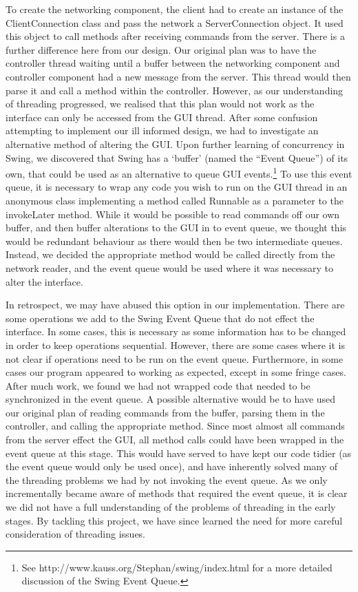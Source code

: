 To create the networking component, the client had to create an instance of the ClientConnection class and pass the network a ServerConnection object. It used this object to call methods after receiving commands from the server. There is a further difference here from our design. Our original plan was to have the controller thread waiting until a buffer between the networking component and controller component had a new message from the server. This thread would then parse it and call a method within the controller. However, as our understanding of threading progressed, we realised that this plan would not work as the interface can only be accessed from the GUI thread. After some confusion attempting to implement our ill informed design, we had to investigate an alternative method of altering the GUI. Upon further learning of concurrency in Swing, we discovered that Swing has a `buffer' (named the ``Event Queue'') of its own, that could be used as an alternative to queue GUI events.\footnote{See http://www.kauss.org/Stephan/swing/index.html for a more detailed discussion of the Swing Event Queue.} To use this event queue, it is necessary to wrap any code you wish to run on the GUI thread in an anonymous class implementing a method called Runnable as a parameter to the invokeLater method.  While it would be possible to read commands off our own buffer, and then buffer alterations to the GUI in to event queue, we thought this would be redundant behaviour as there would then be two intermediate queues. Instead, we decided the appropriate method would be called directly from the network reader, and the event queue would be used where it was necessary to alter the interface.

In retrospect, we may have abused this option in our implementation. There are some operations we add to the Swing Event Queue that do not effect the interface. In some cases, this is necessary as some information has to be changed in order to keep operations sequential. However, there are some cases where it is not clear if operations need to be run on the event queue. Furthermore, in some cases our program appeared to working as expected, except in some fringe cases. After much work, we found we had not wrapped code that needed to be synchronized in the event queue. A possible alternative would be to have used our original plan of reading commands from the buffer, parsing them in the controller, and calling the appropriate method. Since most almost all commands from the server effect the GUI, all method calls could have been wrapped in the event queue at this stage. This would have served to have kept our code tidier (as the event queue would only be used once), and have inherently solved many of the threading problems we had by not invoking the event queue. As we only incrementally became aware of methods that required the event queue, it is clear we did not have a full understanding of the problems of threading in the early stages. By tackling this project, we have since learned the need for more careful consideration of threading issues.

